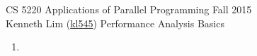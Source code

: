 \documentclass{scrartcl}
\begin{document}
  \begin{framed}
  \large
  CS 5220 Applications of Parallel Programming \hfill Fall 2015 \\
  Kenneth Lim (\href{mailto:kl545@cornell.edu}{kl545}) \hfill Performance Analysis Basics \hspace{-3ex}
  \end{framed}
  \begin{enumerate}
    \item 
  \end{enumerate}
\end{document}
